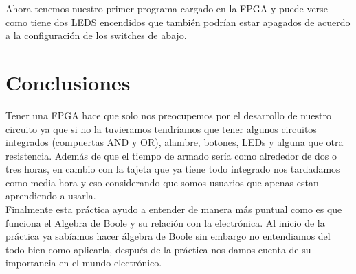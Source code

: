 \documentclass{mylib/reporteConCalif}
\begin{document}

Ahora tenemos nuestro primer programa cargado en la FPGA y puede verse como tiene dos LEDS encendidos que también podrían estar apagados de acuerdo a la configuración de los switches de abajo.\\


\section{Conclusiones}

Tener una FPGA hace que solo nos preocupemos por el desarrollo de nuestro circuito ya que si no la tuvieramos tendríamos que tener algunos circuitos integrados (compuertas AND y OR), alambre, botones, LEDs y alguna que otra resistencia. Además de que el tiempo de armado sería como alrededor de dos o tres horas, en cambio con la tajeta que ya tiene todo integrado nos tardadamos como media hora y eso considerando que somos usuarios que apenas estan aprendiendo a usarla.\\

Finalmente esta práctica ayudo a entender de manera más puntual como es que funciona el Algebra de Boole y su relación con la electrónica. Al inicio de la práctica ya sabíamos hacer álgebra de Boole sin embargo no entendiamos del todo bien como aplicarla, después de la práctica nos damos cuenta de su importancia en el mundo electrónico.
\end{document}
